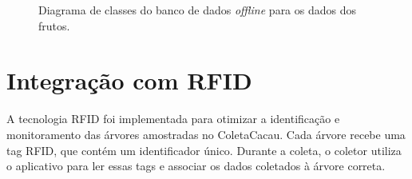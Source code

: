 \begin{figure}[htb]
 \centering
 \caption{Diagrama de classes do banco de dados \textit{offline} para os dados dos frutos.}
 \label{fig:ClassDiagram02}
\end{figure}

\newpage

\section{Integração com RFID}
A tecnologia RFID foi implementada para otimizar a identificação e monitoramento das árvores amostradas no ColetaCacau. Cada árvore recebe uma tag RFID, que contém um identificador único. Durante a coleta, o coletor utiliza o aplicativo para ler essas tags e associar os dados coletados à árvore correta.

